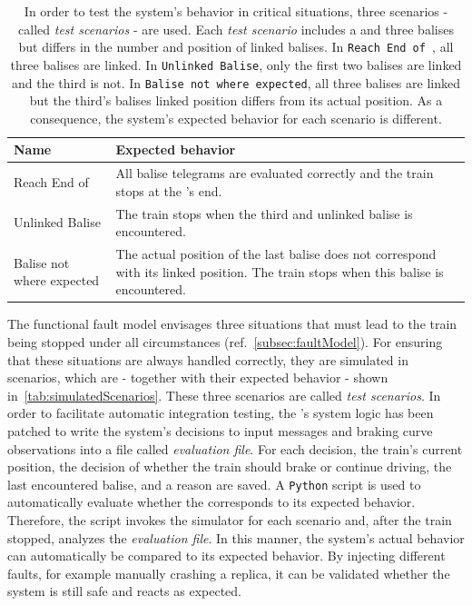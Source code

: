 \begin{table}[h!]
	\begin{center}
		\caption{In order to test the system's behavior in critical situations, three scenarios - called \textit{test scenarios} - are used. Each \textit{test scenario} includes a  and three balises but differs in the number and position of linked balises. In \texttt{Reach End of }, all three balises are linked. In \texttt{Unlinked Balise}, only the first two balises are linked and the third is not. In \texttt{Balise not where expected}, all three balises are linked but the third's balises linked position differs from its actual position. As a consequence, the system's expected behavior for each scenario is different.}
		\label{tab:simulatedScenarios}
		\begin{tabularx}{\textwidth}{|X|X|}
			\hline
			\textbf{Name} & \textbf{Expected behavior}\\
			\hline \hline
			Reach End of \abr{MA} & All balise telegrams are evaluated correctly and the train stops at the \abr{MA}'s end. \\
			\hline
			Unlinked Balise & The train stops when the third and unlinked balise is encountered. \\
			\hline
			Balise not where expected & The actual position of the last balise does not correspond with its linked position. The train stops when this balise is encountered. \\
			\hline
		\end{tabularx}
	\end{center}
\end{table}


The functional fault model envisages three situations that must lead to the train being stopped under all circumstances (ref.~\autoref{subsec:faultModel}).
For ensuring that these situations are always handled correctly, they are simulated in scenarios, which are - together with their expected behavior - shown in~\autoref{tab:simulatedScenarios}.
These three scenarios are called \textit{test scenarios}.
In order to facilitate automatic integration testing, the 's system logic has been patched to write the system's decisions to input messages and braking curve observations into a file called \textit{evaluation file}.
For each decision, the train's current position, the decision of whether the train should brake or continue driving, the last encountered balise, and a reason are saved.
A \texttt{Python} script is used to automatically evaluate whether the  corresponds to its expected behavior.
Therefore, the script invokes the simulator for each scenario and, after the train stopped, analyzes the \textit{evaluation file}.
In this manner, the system's actual behavior can automatically be compared to its expected behavior.
By injecting different faults, for example manually crashing a replica, it can be validated whether the system is still safe and reacts as expected.


